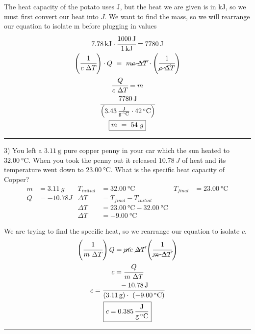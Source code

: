 \documentclass[12pt, oneside, letterpaper]{book}
\begin{document}
The heat capacity of the potato uses $\si{\joule}$, but the heat we are given is in $\si{\kilo\joule}$, so we must first convert our heat into $J$. We want to find the mass, so we will rearrange our equation to isolate m before plugging in values
\begin{gather*} 
\qty{7.78}{\cancel{\kilo\joule}}\cdot \cfrac{\qty{1000}{\joule}}{\qty{1}{\cancel{\kilo\joule}}} = \qty{7780}{\joule} 
\\
\left(\cfrac{1}{c\ \Delta T}\right) \cdot Q\ =\ 
    m \cancel{c\ \Delta T} 
    \cdot \left(\cfrac{1}{\cancel{c\ \Delta} T}\right) 
\\ 
\cfrac{Q}{c\ \Delta T} = m 
\\
\cfrac{\qty{7780}{\joule}}{\left(\qty[per-mode=fraction]{3.43}{\joule\per\gram\per\degreeCelsius} 
    \cdot \qty{42}{\degreeCelsius} \right)} 
\\ 
\boxed{m\ =\ 54\ g}
\end{gather*}
\hrule

3) You left a $\qty{3.11}{\gram}$ pure copper penny in your car which the sun heated to $\qty{32.00}{\degreeCelsius}$. When you took the penny out it released $\qty{10.78}{J}$ of heat and its temperature went down to $\qty{23.00}{\degreeCelsius}$. What is the specific heat capacity of Copper?
\begin{align*}
m &= 3.11\ g  
    & T_{initial}&=\qty{32.00}{\degreeCelsius}\ 
    & T_{final} &=\qty{23.00}{\degreeCelsius}
\\ 
Q&= -10.78J & \Delta T&=T_{final}-T_{initial}
\\
&&  \Delta T&=\qty{23.00}{\degreeCelsius} - \qty{32.00}{\degreeCelsius} 
\\ 
&& \Delta T &= \qty{-9.00}{\degreeCelsius}
\end{align*}

We are trying to find the specific heat, so we rearrange our equation to isolate $c$.
\begin{gather*}
    \left(\cfrac{1}{m\ \Delta T}  \right) Q= 
        \cancel{m}c\ \cancel{\Delta T} 
        \left(\cfrac{1}{\cancel{m\ \Delta T}} \right) 
    \\ 
    c= \cfrac{Q}{m\ \Delta T} 
    \\ 
    c= \cfrac{\qty{-10.78}{\joule}}{(\qty{3.11}{\gram}) \cdot \ (\qty{-9.00}{\degreeCelsius})} 
    \\ 
    \boxed{c= \qty[per-mode=fraction]{0.385}{\joule\per\gram\per\degreeCelsius}}
\end{gather*}
\hrule
\end{document}
